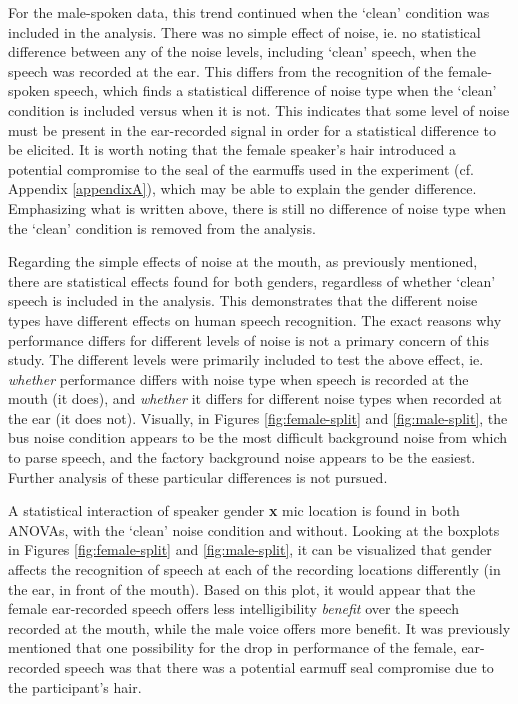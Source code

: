 For the male-spoken data, this trend continued when the `clean' condition was included in the analysis.  There was no simple effect of noise, ie. no statistical difference between any of the noise levels, including `clean' speech, when the speech was recorded at the ear.  This differs from the recognition of the female-spoken speech, which finds a statistical difference of noise type when the `clean' condition is included versus when it is not.  This indicates that some level of noise must be present in the ear-recorded signal in order for a statistical difference to be elicited.  It is worth noting that the female speaker's hair introduced a potential compromise to the seal of the earmuffs used in the experiment (cf. Appendix \DIFdelbegin {}\DIFdelend \ref{appendixA}), which may be able to explain the gender difference. Emphasizing what is written above, there is still no difference of noise type when the `clean' condition is removed from the analysis.

Regarding the simple effects of noise at the mouth, as previously mentioned, there are statistical effects found for both genders, regardless of whether `clean' speech is included in the analysis.  This demonstrates that the different noise types have different effects on human speech recognition.  The exact reasons why performance differs for different levels of noise is not a primary concern of this study.  The different levels were primarily included to test the above effect, ie. \textit{whether} performance differs with noise type when speech is recorded at the mouth (it does), and \textit{whether} it differs for different noise types when recorded at the ear (it does not).   Visually, in Figures \ref{fig:female-split} and \ref{fig:male-split}, the bus noise condition appears to be the most difficult background noise from which to parse speech, and the factory background noise appears to be the easiest.  Further analysis of these particular differences is not pursued.



A statistical interaction of speaker gender \textbf{x} mic location is found in both ANOVAs, with the `clean' noise condition and without.  
Looking at the boxplots in Figures \ref{fig:female-split} and \ref{fig:male-split}, it can be visualized that gender affects the recognition of speech at each of the recording locations differently (in the ear, in front of the mouth).  Based on this plot, it would appear that the female ear-recorded speech offers less intelligibility \textit{benefit} over the speech recorded at the mouth, while the male voice offers more benefit. It was previously mentioned that one possibility for the drop in performance of the female, ear-recorded speech was that there was a potential earmuff seal compromise due to the participant's hair.  

